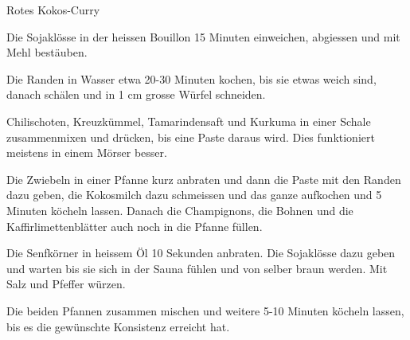 
\begin{recipe}[]{Rotes Kokos-Curry}{}{}



\step
Die Sojakl\"osse in der heissen Bouillon 15 Minuten einweichen, abgiessen und mit Mehl best\"auben.

\step
Die Randen in Wasser etwa 20-30 Minuten kochen, bis sie etwas weich sind, danach sch\"alen und in 1 cm grosse W\"urfel schneiden.

\step
Chilischoten, Kreuzk\"ummel, Tamarindensaft und Kurkuma in einer Schale zusammenmixen und dr\"ucken, bis eine Paste daraus wird. Dies funktioniert meistens in einem M\"orser besser.

\step
Die Zwiebeln in einer Pfanne kurz anbraten und dann die Paste mit den Randen dazu geben, die Kokosmilch dazu schmeissen und das ganze aufkochen und 5 Minuten k\"ocheln lassen. Danach die Champignons, die Bohnen und die Kaffirlimettenbl\"atter auch noch in die Pfanne f\"ullen.

\step
Die Senfk\"orner in heissem \"Ol 10 Sekunden anbraten. Die Sojakl\"osse dazu geben und warten bis sie sich in der Sauna f\"uhlen und von selber braun werden. Mit Salz und Pfeffer w\"urzen.

\step
Die beiden Pfannen zusammen mischen und weitere 5-10 Minuten k\"ocheln lassen, bis es die gew\"unschte Konsistenz erreicht hat.


\end{recipe}